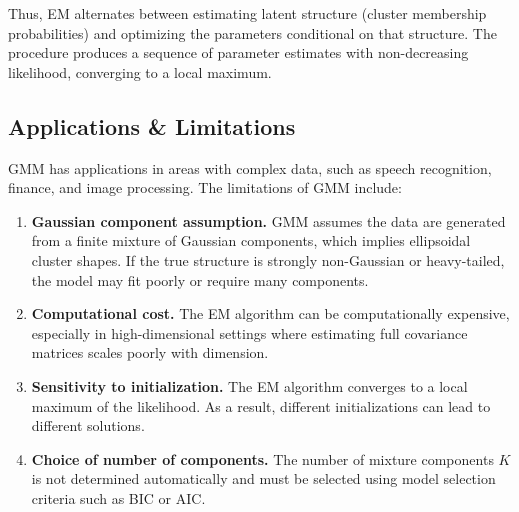 Thus, EM alternates between estimating latent structure (cluster
membership probabilities) and optimizing the parameters conditional
on that structure. The procedure produces a sequence of parameter
estimates with non-decreasing likelihood, converging to a local maximum.

\bigskip

\subsection{Applications \& Limitations}

\medskip

GMM has applications in areas with complex data, such as speech recognition, finance, and image processing. The limitations of GMM include:

\begin{enumerate}[itemsep=0.5em]
    \item \textbf{Gaussian component assumption.} 
    GMM assumes the data are generated from a finite mixture of Gaussian components, 
    which implies ellipsoidal cluster shapes. If the true structure is strongly 
    non-Gaussian or heavy-tailed, the model may fit poorly or require many components.

    \item \textbf{Computational cost.} 
    The EM algorithm can be computationally expensive, especially in 
    high-dimensional settings where estimating full covariance matrices 
    scales poorly with dimension.

    \item \textbf{Sensitivity to initialization.} 
    The EM algorithm converges to a local maximum of the likelihood. 
    As a result, different initializations can lead to different solutions.

    \item \textbf{Choice of number of components.} 
    The number of mixture components $K$ is not determined automatically 
    and must be selected using model selection criteria such as BIC or AIC.
\end{enumerate}

